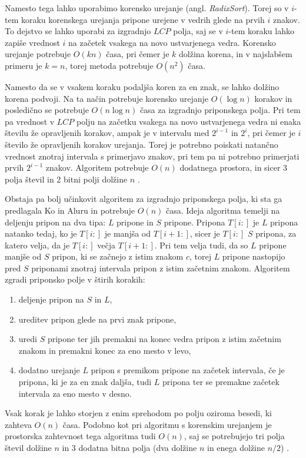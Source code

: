 Namesto tega lahko uporabimo korensko urejanje (angl. \textit{RadixSort}). Torej so v $i$-tem koraku korenskega urejanja pripone urejene v vedrih glede na prvih $i$ znakov. To dejstvo se lahko uporabi za izgradnjo $LCP$ polja, saj se v $i$-tem koraku lahko zapiše vrednost $i$ na začetek vsakega na novo ustvarjenega vedra. Korensko urejanje potrebuje $O(kn)$ časa, pri čemer je $k$ dolžina korena, in v najslabšem primeru je $k=n$, torej metoda potrebuje $O(n^2)$ časa.

Namesto da se v vsakem koraku podaljša koren za en znak, se lahko dolžino korena podvoji. Na ta način potrebuje korensko urejanje $O(\log{n})$ korakov in posledično se potrebuje $O(n\log{n})$ časa za izgradnjo priponskega polja. Pri tem pa vrednost v $LCP$ polju na začetku vsakega na novo ustvarjenega vedra ni enaka številu že opravljenih korakov, ampak je v intervalu med $2^{i-1}$ in $2^{i}$, pri čemer je $i$ število že opravljenih korakov urejanja. Torej je potrebno poiskati natančno vrednost znotraj intervala s primerjavo znakov, pri tem pa ni potrebno primerjati prvih $2^{i-1}$ znakov. Algoritem potrebuje $O(n)$ dodatnega prostora, in sicer 3 polja števil in 2 bitni polji dolžine $n$ \cite{Manber1990}.


Obstaja pa bolj učinkovit algoritem za izgradnjo priponskega polja, ki sta ga predlagala Ko in Aluru \cite{Ko2005} in potrebuje $O(n)$ časa. Ideja algoritma temelji na deljenju pripon na dva tipa: $L$ pripone in $S$ pripone. Pripona $T[i:]$ je $L$ pripona natanko tedaj, ko je $T[i:]$ je manjša od $T[i+1:]$, sicer je $T[i:]$ $S$ pripona, za katero velja, da je $T[i:]$ večja $T[i+1:]$. Pri tem velja tudi, da so $L$ pripone manjše od $S$ pripon, ki se začnejo z istim znakom $c$, torej $L$ pripone nastopijo pred $S$ priponami znotraj intervala pripon z istim začetnim znakom. Algoritem zgradi priponsko polje v štirih korakih:
\begin{enumerate}
    \item deljenje pripon na $S$ in $L$,
    \item ureditev pripon glede na prvi znak pripone,
    \item uredi $S$ pripone ter jih premakni na konec vedra pripon z istim začetnim znakom in premakni konec za eno mesto v levo,
    \item dodatno urejanje $L$ pripon s premikom pripone na začetek intervala, če je pripona, ki je za en znak daljša, tudi $L$ pripona ter se premakne začetek intervala za eno mesto v desno.
\end{enumerate}
Vsak korak je lahko storjen z enim sprehodom po polju oziroma besedi, ki zahteva $O(n)$ časa. Podobno kot pri algoritmu s korenskim urejanjem je prostorska zahtevnost tega algoritma tudi $O(n)$, saj se potrebujejo tri polja števil dolžine $n$ in 3 dodatna bitna polja (dva dolžine $n$ in enega dolžine $n/2$) \cite{Ko2005}.